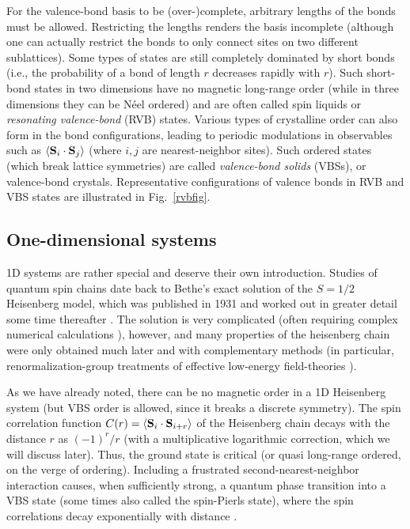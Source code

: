 \documentclass[draft,numberedheadings]{aipproc}
\begin{document}
For the valence-bond basis to be (over-)complete, arbitrary lengths of the bonds must be allowed. Restricting the lengths renders the basis incomplete 
(although one can actually restrict the bonds to only connect sites on two different sublattices). Some types of states are still completely 
dominated by short bonds (i.e., the probability of a bond of length $r$ decreases rapidly with $r$). Such short-bond 
states in two dimensions have no magnetic long-range order (while in three dimensions they can be N\'eel ordered) and are often called spin liquids or 
{\it resonating valence-bond} (RVB) states. Various types of crystalline order can also form in the bond configurations, leading to periodic modulations 
in observables such as $\langle {\bf S}_i \cdot {\bf S}_j\rangle$ (where $i,j$ are nearest-neighbor sites). Such ordered states (which break lattice 
symmetries) are called {\it valence-bond solids} (VBSs), or valence-bond crystals. Representative configurations of valence bonds in RVB and VBS states 
are illustrated in Fig.~\ref{rvbfig}.

\subsection{One-dimensional systems}
\label{chains}

1D systems are rather special and deserve their own introduction. Studies of quantum spin chains date back to Bethe's exact solution 
of the $S=1/2$ Heisenberg model, which was published in 1931 \cite{bethe} and worked out in greater detail some time thereafter \cite{hulthen}. The solution 
is very complicated (often requiring complex numerical calculations \cite{caux,maillet}), however, and many properties of the heisenberg chain were 
only obtained much later and with complementary methods (in particular, renormalization-group treatments of effective low-energy field-theories 
\cite{haldane1,affleck1,affleck2,singh1,giamarchi}). 

As we have already noted, there can be no magnetic order in a 1D Heisenberg system (but VBS order is allowed, since it breaks a discrete symmetry). 
The spin correlation function $C(r)=\langle {\bf S}_{i}\cdot {\bf S}_{i+r}\rangle$ of the Heisenberg chain decays 
with the distance $r$ as $(-1)^r/r$ (with a multiplicative logarithmic correction, which we will discuss later). Thus, the ground state is critical (or 
quasi long-range ordered, on the verge of ordering). Including a frustrated second-nearest-neighbor interaction causes, when sufficiently strong, a 
quantum phase transition into a VBS state (some times also called the spin-Pierls state), where the spin correlations decay exponentially with 
distance \cite{majumdarghosh}.
\end{document}
